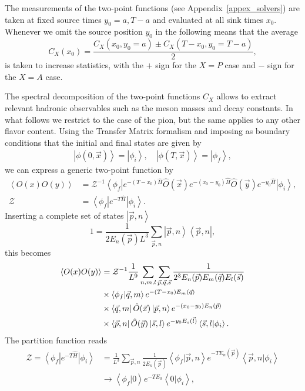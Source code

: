 The measurements of the two-point functions (see Appendix~\ref{appex_solvers}) are taken at fixed source times $y_0=a,T-a$ and evaluated at all sink times $x_0$. Whenever we omit the source position $y_0$ in the following means that the average
\begin{equation}
C_X(x_0)=\frac{C_X(x_0,y_0=a)\pm C_X(T-x_0,y_0=T-a)}{2},
\end{equation}
is taken to increase statistics, with the $+$ sign for the $X=P$ case and $-$ sign for the $X=A$ case.

The spectral decomposition of the two-point functions $C_X$ allows to extract relevant hadronic observables such as the meson masses and decay constants. In what follows we restrict to the case of the pion, but the same applies to any other flavor content. Using the Transfer Matrix formalism and imposing as boundary conditions that the initial and final states are given by
\begin{gather}
\left|\phi(0,\vec{x})\right>=\left|\phi_i\right>, \quad \left|\phi(T,\vec{x})\right>=\left|\phi_f\right>,
\end{gather}
we can express a generic two-point function by
\begin{align}
\label{ch_observables:eq:spectral}
\left<O(x)O(y)\right>&=\mathcal{Z}^{-1}\left<\phi_f\right|e^{-(T-x_0)\hat{H}}\hat{O}(\vec{x})e^{-(x_0-y_0)\hat{H}}\hat{O}(\vec{y})e^{-y_0\hat{H}}\left|\phi_i\right>, \\
\mathcal{Z}&=\left<\phi_f\right|e^{-T\hat{H}}\left|\phi_i\right>.
\end{align}
Inserting a complete set of states $\left|\vec{p},n\right>$
\begin{equation}
1=\frac{1}{2E_n(\vec{p})L^3}\sum_{\vec{p},n}\left|\vec{p},n\right>\left<\vec{p},n\right|,
\end{equation}
this becomes
\begin{align}
\left<O(x)O(y)\right>&=\mathcal{Z}^{-1}\frac{1}{L^9}\sum_{n,m,l}\sum_{\vec{p},\vec{q},\vec{s}}\frac{1}{2^3E_n(\vec{p})E_m(\vec{q})E_l(\vec{s})} \notag \\
&\times\left<\phi_f|\vec{q},m\right>e^{-(T-x_0)E_m(\vec{q})} \notag \\
&\times\left<\vec{q},m\right|\hat{O}(\vec{x})\left|\vec{p},n\right>e^{-(x_0-y_0)E_n(\vec{p})} \notag \\
&\times\left<\vec{p},n\right|\hat{O}(\vec{y})\left|\vec{s},l\right>e^{-y_0E_s(\vec{l})}\left<\vec{s},l|\phi_i\right>. 
\end{align}
The partition function reads
\begin{align}
\mathcal{Z}=\left<\phi_f\right|e^{-T\hat{H}}\left|\phi_i\right>&=\frac{1}{L^3}\sum_{\vec{p},n}\frac{1}{2E_n(\vec{p})}\left<\phi_f|\vec{p},n\right>e^{-TE_n(\vec{p})}\left<\vec{p},n|\phi_i\right>\\&\rightarrow\left<\phi_f|0\right>e^{-TE_0}\left<0|\phi_i\right>,
\end{align}
